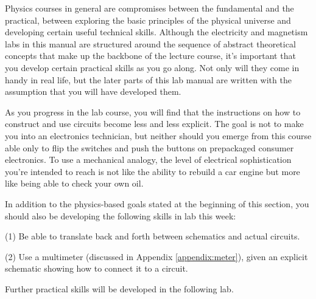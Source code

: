 Physics courses in general are compromises between the
fundamental and the practical, between exploring the basic
principles of the physical universe and developing certain
useful technical skills. Although the electricity and
magnetism labs in this manual are structured around the
sequence of abstract theoretical concepts that make up the
backbone of the lecture course, it's important that you
develop certain practical skills as you go along. Not only
will they come in handy in real life, but the later parts of
this lab manual are written with the assumption that you
will have developed them.

As you progress in the lab course, you will find that the
instructions on how to construct and use circuits become
less and less explicit. The goal is not to make you into an
electronics technician, but neither should you emerge from
this course able only to flip the switches and push the
buttons on prepackaged consumer electronics. To use a
mechanical analogy, the level of electrical sophistication
you're intended to reach is not like the ability to rebuild
a car engine but more like being able to check your own oil.

In addition to the physics-based goals stated at the
beginning of this section, you should also be developing the
following skills in lab this week:

(1) Be able to translate back and forth between schematics
and actual circuits.

(2) Use a multimeter (discussed in Appendix \ref{appendix:meter}), 
given an explicit schematic showing how to
connect it to a circuit.

Further practical skills will be developed in the following lab.

